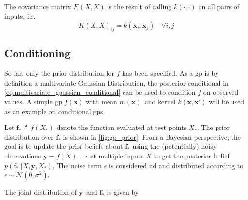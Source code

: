 The covariance matrix $K(X, X)$ is the result of calling $k(\cdot, \cdot)$ on all pairs of inputs, i.e.
\begin{equation} 
    K(X, X)_{ij} = k(\boldsymbol{x}_i, \boldsymbol{x}_j) \quad \forall i, j
\end{equation}

\subsection{Conditioning}
So far, only the prior distribution for $f$ has been specified. As a \acrshort{gp} is by definition a multivariate Gaussian Distribution, the posterior conditional in \cref{eq:multivariate_gaussian_conditional} can be used to condition $f$ on observed values. A simple \acrshort{gp} $f(\boldsymbol{x})$ with mean $m(\boldsymbol{x})$ and kernel $k(\boldsymbol{x}, \boldsymbol{x}')$ will be used as an example on conditional \acrshort{gp}s.

Let $\boldsymbol{f}_* \triangleq f(X_*)$ denote the function evaluated at test points $X_*$. The prior distribution over $\boldsymbol{f_*}$ is shown in \cref{fig:gp_prior}. From a Bayesian perspective, the goal is to update the prior beliefs about $\boldsymbol{f}_*$ using the (potentially) noisy observations $\boldsymbol{y} = f(X) + \epsilon$ at multiple inputs $X$ to get the posterior belief $p(\boldsymbol{f}_* \; | X, \boldsymbol{y}, X_*)$. The noise term $\epsilon$ is considered \acrshort{iid} and distributed according to $\epsilon \sim \mathcal{N}(0, \sigma^2)$.

The joint distribution of $\boldsymbol{y}$ and $\boldsymbol{f}_*$ is given by 

